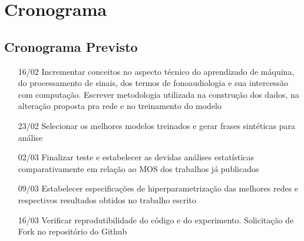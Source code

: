 \chapter{Cronograma}
\label{cap:trab_futuros}

\section{Cronograma Previsto}
\begin{itemize}
    \item [16/02]{Incrementar conceitos no aspecto técnico do aprendizado de máquina, do processamento de sinais, dos termos de fonoaudiologia e sua intercessão com computação. Escrever  metodologia utilizada na construção dos dados, na alteração proposta pra rede e no treinamento do modelo}
    \item[23/02]{Selecionar os melhores modelos treinados e gerar frases sintéticas para análise}
    \item[02/03]{Finalizar teste e estabelecer as devidas análises estatísticas comparativamente em relação ao MOS dos trabalhos já publicados}
    \item[09/03]{Estabelecer especificações de hiperparametrização das melhores redes e respectivos resultados obtidos no trabalho escrito}
    \item[16/03]{Verificar reprodutibilidade do código e do experimento. Solicitação de Fork no repositório do Github}
\end{itemize}

